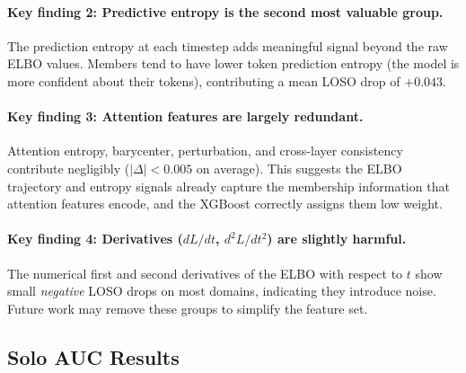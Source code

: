 \documentclass[11pt,a4paper]{article}
\begin{document}
\paragraph{Key finding 2: Predictive entropy is the second most valuable group.}
The prediction entropy at each timestep adds meaningful signal beyond the raw
ELBO values. Members tend to have lower token prediction entropy (the model is
more confident about their tokens), contributing a mean LOSO drop of $+0.043$.

\paragraph{Key finding 3: Attention features are largely redundant.}
Attention entropy, barycenter, perturbation, and cross-layer consistency
contribute negligibly ($|\Delta| < 0.005$ on average). This suggests the
ELBO trajectory and entropy signals already capture the membership information
that attention features encode, and the XGBoost correctly assigns them low weight.

\paragraph{Key finding 4: Derivatives ($dL/dt$, $d^2L/dt^2$) are slightly harmful.}
The numerical first and second derivatives of the ELBO with respect to $t$
show small \emph{negative} LOSO drops on most domains, indicating they
introduce noise. Future work may remove these groups to simplify the feature set.

\subsection{Solo AUC Results}
\label{sec:solo_results}
\end{document}

